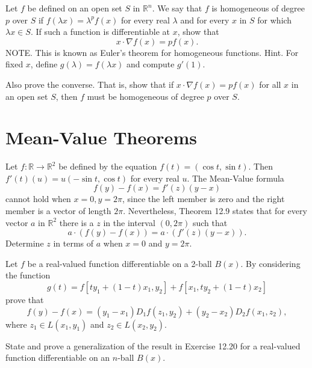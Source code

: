 \begin{problembox}
Let \( f \) be defined on an open set \( S \) in \( \mathbb{R}^n \). We say that \( f \) is homogeneous of degree \( p \) over \( S \) if \( f(\lambda x) = \lambda^p f(x) \) for every real \( \lambda \) and for every \( x \) in \( S \) for which \( \lambda x \in S \). If such a function is differentiable at \( x \), show that
\[x \cdot \nabla f(x) = p f(x).\]
NOTE. This is known as Euler's theorem for homogeneous functions. Hint. For fixed \( x \), define \( g(\lambda) = f(\lambda x) \) and compute \( g'(1) \).

Also prove the converse. That is, show that if \( x \cdot \nabla f(x) = p f(x) \) for all \( x \) in an open set \( S \), then \( f \) must be homogeneous of degree \( p \) over \( S \).
\end{problembox}

\section{Mean-Value Theorems}

\begin{problembox}
Let \( f: \mathbb{R} \rightarrow \mathbb{R}^2 \) be defined by the equation \( f(t) = (\cos t, \sin t) \). Then \( f'(t)(u) = u(-\sin t, \cos t) \) for every real \( u \). The Mean-Value formula
\[f(y) - f(x) = f'(z)(y - x)\]
cannot hold when \( x = 0, y = 2\pi \), since the left member is zero and the right member is a vector of length \( 2\pi \). Nevertheless, Theorem 12.9 states that for every vector \( a \) in \( \mathbb{R}^2 \) there is a \( z \) in the interval \( (0, 2\pi) \) such that
\[a \cdot (f(y) - f(x)) = a \cdot (f'(z)(y - x)).\]
Determine \( z \) in terms of \( a \) when \( x = 0 \) and \( y = 2\pi \).
\end{problembox}

\begin{problembox}
Let \( f \) be a real-valued function differentiable on a 2-ball \( B(x) \). By considering the function
\[g(t) = f[ty_1 + (1 - t)x_1, y_2] + f[x_1, ty_2 + (1 - t)x_2]\]
prove that
\[f(y) - f(x) = (y_1 - x_1)D_1f(z_1, y_2) + (y_2 - x_2)D_2f(x_1, z_2),\]
where \( z_1 \in L(x_1, y_1) \) and \( z_2 \in L(x_2, y_2) \).
\end{problembox}

\begin{problembox}
State and prove a generalization of the result in Exercise 12.20 for a real-valued function differentiable on an \( n \)-ball \( B(x) \).
\end{problembox}

